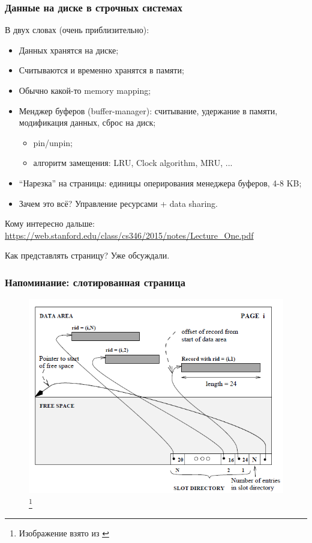 \documentclass{beamer}
\begin{document}
\begin{frame}
\frametitle{Данные на диске в строчных системах}

В двух словах (очень приблизительно):

\begin{itemize}
	\item Данных хранятся на диске;
	\item Считываются и \alert{временно} хранятся в памяти;
	\item Обычно какой-то memory mapping;
	\item Менджер буферов (buffer-manager): считывание, удержание в памяти, модификация данных, сброс на диск;
	\begin{itemize}
		\item pin/unpin;
		\item алгоритм замещения: LRU, Clock algorithm, MRU, ...
	\end{itemize}
	\item ``Нарезка'' на страницы: единицы оперирования менеджера буферов, 4-8 KB;
	\item \alert{Зачем это всё? Управление ресурсами + data sharing.}
\end{itemize}

Кому интересно дальше: \small{\url{https://web.stanford.edu/class/cs346/2015/notes/Lecture_One.pdf}}

Как представлять страницу? Уже обсуждали.

\end{frame}

\begin{frame}
\frametitle{Напоминание: слотированная страница}

\begin{figure}[htb]
\includegraphics[width=\textwidth,height=0.8\textheight,keepaspectratio]{slotted.png} 
\footnote{\tiny{Изображение взято из \cite{Ramakrishnan2000}}}
\end{figure}

\end{frame}
\end{document}
